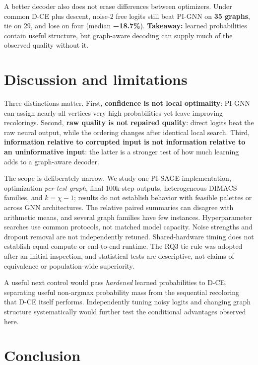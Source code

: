 \documentclass[11pt,letterpaper,twocolumn]{article}
\begin{document}
A better decoder also does not erase differences between optimizers. Under common D-CE plus descent, noise-2 free logits still beat PI-GNN on \textbf{35 graphs}, tie on 29, and lose on four (median \textbf{−18.7\%}). \textbf{Takeaway:} learned probabilities contain useful structure, but graph-aware decoding can supply much of the observed quality without it.

\section{Discussion and limitations}\label{discussion-and-limitations}

Three distinctions matter. First, \textbf{confidence is not local optimality}: PI-GNN can assign nearly all vertices very high probabilities yet leave improving recolorings. Second, \textbf{raw quality is not repaired quality}: direct logits beat the raw neural output, while the ordering changes after identical local search. Third, \textbf{information relative to corrupted input is not information relative to an uninformative input}: the latter is a stronger test of how much learning adds to a graph-aware decoder.

The scope is deliberately narrow. We study one PI-SAGE implementation, optimization \emph{per test graph}, final 100k-step outputs, heterogeneous DIMACS families, and \(k=\chi-1\); results do not establish behavior with feasible palettes or across GNN architectures. The relative paired summaries can disagree with arithmetic means, and several graph families have few instances. Hyperparameter searches use common protocols, not matched model capacity. Noise strengths and dropout removal are not independently retuned. Shared-hardware timing does not establish equal compute or end-to-end runtime. The RQ3 tie rule was adopted after an initial inspection, and statistical tests are descriptive, not claims of equivalence or population-wide superiority.

A useful next control would pass \emph{hardened} learned probabilities to D-CE, separating useful non-argmax probability mass from the sequential recoloring that D-CE itself performs. Independently tuning noisy logits and changing graph structure systematically would further test the conditional advantages observed here.

\section{Conclusion}\label{conclusion}
\end{document}
